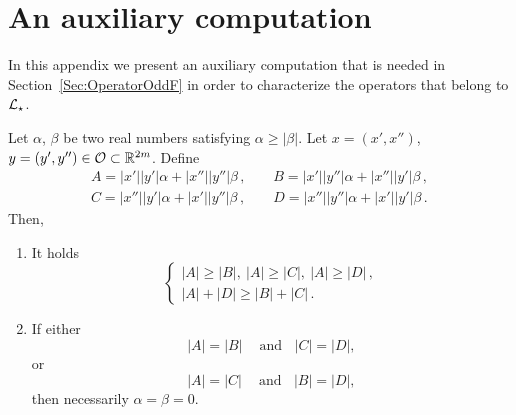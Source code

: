 \section{An auxiliary computation}
\label{Sec:AuxiliaryResults2}

In this appendix we present an auxiliary computation that is needed in Section~\ref{Sec:OperatorOddF} in order to characterize the operators that belong to $\mathcal{L}_\star$.

\begin{lemma}
\label{Lemma:ComputationABCD} Let $\alpha$, $\beta$ be two real numbers satisfying $\alpha \geq
|\beta|$. Let $x=(x',x'')$, $y=(y',y'')\in \mathcal{O} \subset \mathbb{R}^{2m}$. Define
$$
\begin{array}{cc}
	A = |x'||y'|  \alpha + |x''||y''|\beta \,, \ \ \ \ \ &
	B = |x'||y''| \alpha + |x''||y'| \beta \,, \\
	C = |x''||y'| \alpha + |x'||y''| \beta \,, \ \ \ \ \ &
	D = |x''||y''|\alpha + |x'||y'|  \beta \,.
\end{array}
$$
Then,
\begin{enumerate}
\item It holds
$$
\begin{cases}
|A| \geq |B|,\ |A| \geq|C|, \ |A| \geq|D|\,, \\
|A| + |D| \geq |B| + |C|\,.
\end{cases}
$$
\item If either
$$ |A| = |B| \ \ \ \ \textrm{ and} \ \ \ \ |C| = |D|, $$
or
$$ |A| = |C| \ \ \ \ \textrm{ and} \ \ \ \ |B| = |D|, $$
then necessarily $\alpha = \beta = 0$.
\end{enumerate}

\end{lemma}
